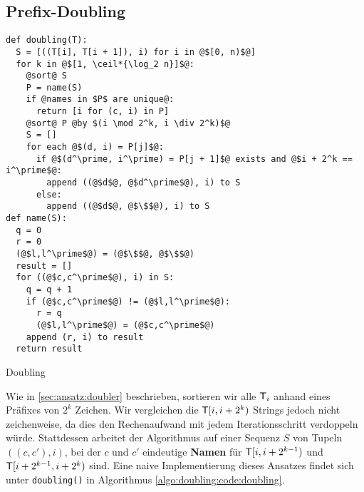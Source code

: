 \subsection{Prefix-Doubling}
\label{algo:doubling:sec:doubling}
\begin{listing}[htp]
\begin{verbatim}
def doubling(T):
  S = [((T[i], T[i + 1]), i) for i in @$[0, n)$@]
  for k in @$[1, \ceil*{\log_2 n}]$@:
    @sort@ S
    P = name(S)
    if @names in $P$ are unique@:
      return [i for (c, i) in P]
    @sort@ P @by $(i \mod 2^k, i \div 2^k)$@
    S = []
    for each @$(d, i) = P[j]$@:
      if @$(d^\prime, i^\prime) = P[j + 1]$@ exists and @$i + 2^k == i^\prime$@:
        append ((@$d$@, @$d^\prime$@), i) to S
      else:
        append ((@$d$@, @$\$$@), i) to S
def name(S):
  q = 0
  r = 0
  (@$l,l^\prime$@) = (@$\$$@, @$\$$@)
  result = []
  for ((@$c,c^\prime$@), i) in S:
    q = q + 1
    if (@$c,c^\prime$@) != (@$l,l^\prime$@):
      r = q
      (@$l,l^\prime$@) = (@$c,c^\prime$@)
    append (r, i) to result
  return result
\end{verbatim}
\caption{Doubling} 
\label{algo:doubling:code:doubling}
\end{listing}

Wie in \cref{sec:ansatz:doubler} beschrieben, sortieren wir alle $\inputtext_i$ anhand eines Präfixes von $2^k$ Zeichen. Wir vergleichen die $\inputtext{}[i, i + 2^k)$ Strings jedoch nicht zeichenweise, da dies den Rechenaufwand mit jedem Iterationsschritt verdoppeln würde. Stattdessen arbeitet der Algorithmus auf einer Sequenz $S$ von Tupeln $((c, c'), i)$, bei der $c$ und $c'$ eindeutige \textbf{Namen} für $\inputtext{}[i, i + 2^{k-1})$ und $\inputtext{}[i + 2^{k-1}, i + 2^k)$ sind. Eine naive Implementierung dieses Ansatzes findet sich unter \texttt{doubling()} in Algorithmus \ref{algo:doubling:code:doubling}.

